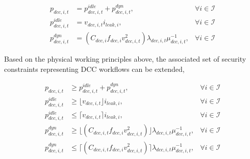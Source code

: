 \documentclass[lettersize,journal]{IEEEtran}
\begin{document}
\vspace{-0.25cm}
\begin{subequations}
	\begin{align}
		\!\!\!\!p_{dcc,i,t}        & = p_{dcc,i,t}^{idle} + p_{dcc,i,t}^{dyn},                                                             & \forall i\in\mathcal{I}  \\
		\!\!\!\!p_{dcc,i,t}^{idle} & = v_{dcc,i,t} i_{leak,i},                                                                             & \forall i\in\mathcal{I}  \\
		\!\!\!\!p_{dcc,i,t}^{dyn}  & = {\left( C_{dcc,i} f_{dcc,i} v_{dcc,i,t}^{2} \right )}{\lambda_{dcc,i,t}}{\mu_{dcc,i,t}^{-1}},\!\!\! & \forall i\in \mathcal{I}
	\end{align}
\end{subequations}

\noindent

Based on the physical working principles above, the associated set of security constraints representing DCC workflows can be extended,

\vspace{-0.25cm}
\begin{subequations}
	\begin{align}
		\!\!\!\!p_{dcc,i,t}        & \!\geq\! p_{dcc,i,t}^{idle} \!+\! p_{dcc,i,t}^{dyn},                                                        & \forall i\in\mathcal{I}  \\
		\!\!\!\!p_{dcc,i,t}^{idle} & \!\geq\! \lfloor {v}_{dcc,i,t}\rfloor i_{leak,i},                                                           & \forall i\in\mathcal{I}  \\
		\!\!\!\!p_{dcc,i,t}^{idle} & \!\leq\! \lceil {v}_{dcc,i,t}\rceil i_{leak,i},                                                             & \forall i \in\mathcal{I} \\
		\!\!\!\!p_{dcc,i,t}^{dyn}  & \!\geq\! \lfloor ( C_{dcc,i,t} f_{dcc,i} v_{dcc,i,t}^{2} ) \rfloor {\lambda_{dcc,i,t}}{\mu_{dcc,i,t}^{-1}}, & \forall i \in\mathcal{I} \\
		\!\!\!\!p_{dcc,i,t}^{dyn}  & \!\leq\! \lceil ( C_{dcc,i,t} f_{dcc,i} v_{dcc,i,t}^{2} ) \rceil {\lambda_{dcc,i,t}}{\mu_{dcc,i,t}^{-1}},   & \forall i \in\mathcal{I}
	\end{align}
\end{subequations}
\end{document}
